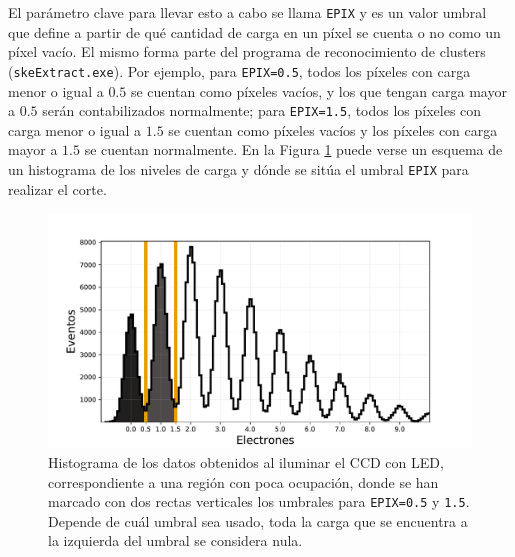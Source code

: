 El parámetro clave para llevar esto a cabo se llama \verb|EPIX| y es un valor umbral que define a partir de qué cantidad de carga en un píxel se cuenta o no como un píxel vacío. El mismo forma parte del programa de reconocimiento de clusters (\verb|skeExtract.exe|). Por ejemplo, para \verb|EPIX=0.5|, todos los píxeles con carga menor o igual a $0.5$ se cuentan como píxeles vacíos, y los que tengan carga mayor a $0.5$ serán contabilizados normalmente; para \verb|EPIX=1.5|, todos los píxeles con carga menor o igual a $1.5$ se cuentan como píxeles vacíos y los píxeles con carga mayor a $1.5$ se cuentan normalmente. En la Figura \ref{fig:HistogramaEPIX} puede verse un esquema de un histograma de los niveles de carga y dónde se sitúa el umbral \verb|EPIX| para realizar el corte.
\begin{figure}[h]
    \centering
        \includegraphics[scale=0.5]{Figs/EsquemaEPIX_histocarga.pdf}
    \caption{Histograma de los datos obtenidos al iluminar el CCD con LED, correspondiente a una región con poca ocupación, donde se han marcado con dos rectas verticales los umbrales para \texttt{EPIX=0.5} y \texttt{1.5}. Depende de cuál umbral sea usado, toda la carga que se encuentra a la izquierda del umbral se considera nula.}
    \label{fig:HistogramaEPIX}
\end{figure}

